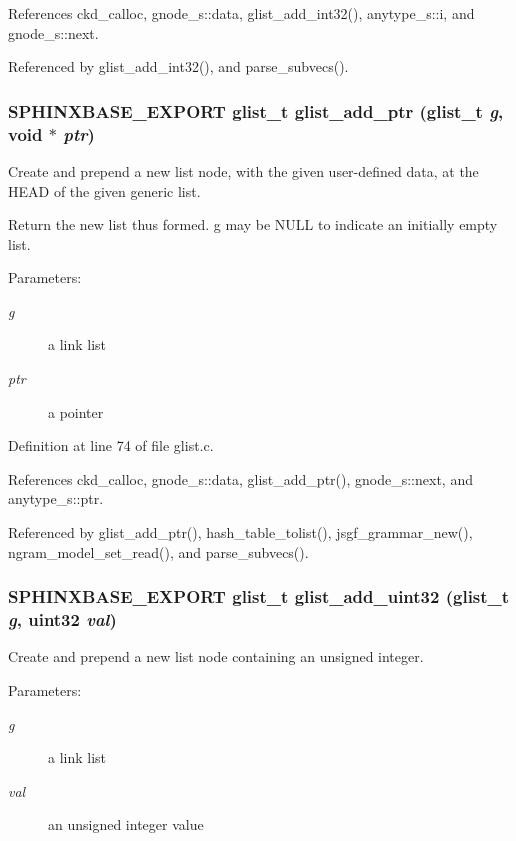 References ckd\_\-calloc, gnode\_\-s::data, glist\_\-add\_\-int32(), anytype\_\-s::i, and gnode\_\-s::next.

Referenced by glist\_\-add\_\-int32(), and parse\_\-subvecs().
\subsubsection[{glist\_\-add\_\-ptr}]{\setlength{\rightskip}{0pt plus 5cm}SPHINXBASE\_\-EXPORT {\bf glist\_\-t} glist\_\-add\_\-ptr ({\bf glist\_\-t} {\em g}, \/  void $\ast$ {\em ptr})}\label{glist_8h_77a9c20b7df5a289477af405ab778377}


Create and prepend a new list node, with the given user-defined data, at the HEAD of the given generic list. 

Return the new list thus formed. g may be NULL to indicate an initially empty list. \begin{Desc}
\item[Parameters: ]\par
\begin{description}
\item[{\em 
g}]a link list \item[{\em 
ptr}]a pointer \end{description}
\end{Desc}


Definition at line 74 of file glist.c.

References ckd\_\-calloc, gnode\_\-s::data, glist\_\-add\_\-ptr(), gnode\_\-s::next, and anytype\_\-s::ptr.

Referenced by glist\_\-add\_\-ptr(), hash\_\-table\_\-tolist(), jsgf\_\-grammar\_\-new(), ngram\_\-model\_\-set\_\-read(), and parse\_\-subvecs().
\subsubsection[{glist\_\-add\_\-uint32}]{\setlength{\rightskip}{0pt plus 5cm}SPHINXBASE\_\-EXPORT {\bf glist\_\-t} glist\_\-add\_\-uint32 ({\bf glist\_\-t} {\em g}, \/  uint32 {\em val})}\label{glist_8h_eb741d435322f34df5e5d3a99abf00de}


Create and prepend a new list node containing an unsigned integer. 

\begin{Desc}
\item[Parameters: ]\par
\begin{description}
\item[{\em 
g}]a link list \item[{\em 
val}]an unsigned integer value \end{description}
\end{Desc}


